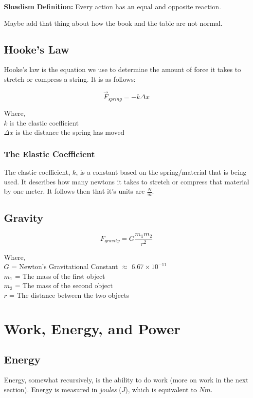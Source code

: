 \documentclass{article}
\begin{document}
\noindent \textbf{Sloadism Definition:} Every action has an equal and opposite reaction.

Maybe add that thing about how the book and the table are not normal.

\subsection{Hooke's Law}
Hooke's law is the equation we use to determine the amount of force it takes to stretch or
compress a string. It is as follows:

\begin{equation}\label{eq : hooke}
    \vec{F}_{spring} = -k \Delta x
\end{equation}

\noindent Where, \\
\indent $k$ is the elastic coefficient \\
\indent $\Delta x$ is the distance the spring has moved

\subsubsection{The Elastic Coefficient}
The elastic coefficient, $k$, is a constant based on the spring/material that is being used.
It describes how many newtons it takes to stretch or compress that material by one meter.
It follows then that it's units are $\frac{N}{m}$.
\subsection{Gravity}
\begin{equation}\label{eq : grav force}
    F_{gravity} = G\frac{m_1 m_2}{r^2}
\end{equation}

\noindent Where, \\
\indent $G$ = Newton's Gravitational Constant $\approx$ $6.67 \times 10^{-11}$ \\
\indent $m_1$ = The mass of the first object \\
\indent $m_2$ = The mass of the second object \\
\indent $r$ = The distance between the two objects \\

\newpage
\section{Work, Energy, and Power}
\subsection{Energy}
Energy, somewhat recursively, is the ability to do work (more on work
in the next section). Energy is measured in \textit{joules} ($J$), which is equivalent to
$Nm$.
\end{document}

